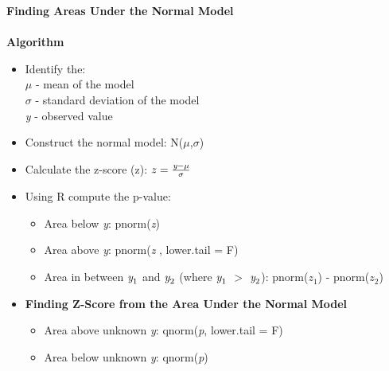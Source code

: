 \documentclass{article}
\begin{document}
\noindent
\textbf{Finding Areas Under the Normal Model}\\\\
\textbf{Algorithm}
\begin{itemize}
    \item Identify the: \\
    \begin{math}\mu\end{math} - mean of the model \\
    \begin{math}\sigma\end{math} - standard deviation of the model \\
    \emph{y} - observed value
    \item Construct the normal model: N(\begin{math}\mu\end{math},\begin{math}\sigma\end{math})
    \item Calculate the z-score (z): \begin{math}z = \frac{\emph{y} - \mu}{\sigma}\end{math}
    \item Using R compute the p-value:
    \begin{itemize}
        \item Area below \emph{y}: pnorm(\emph{z})
        \item Area above \emph{y}: pnorm(\emph{z} , lower.tail = F)
        \item Area in between \begin{math}\emph{y}_1\end{math} and \begin{math}\emph{y}_2\end{math} (where \begin{math}\emph{y}_1\end{math} $>$ \begin{math}\emph{y}_2\end{math}): pnorm(\begin{math}z_1\end{math}) - pnorm(\begin{math}z_2\end{math})
    \end{itemize}
    \item \textbf{Finding Z-Score from the Area Under the Normal Model}
    \begin{itemize}
        \item Area above unknown \emph{y}: qnorm(\emph{p}, lower.tail = F)
        \item Area below unknown \emph{y}: qnorm(\emph{p})
    \end{itemize}
\end{itemize}
\end{document}
